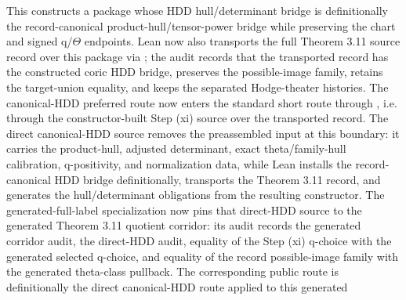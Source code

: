 \begin{proposition}
  This constructs a package whose HDD hull/determinant bridge is definitionally
  the record-canonical product-hull/tensor-power bridge while preserving the
  chart and signed q/\(\Theta\) endpoints.  Lean now also transports the full
  Theorem 3.11 source record over this package via
  ;
  the audit
  records that the transported record has the constructed coric HDD bridge,
  preserves the possible-image family, retains the target-union equality, and
  keeps the separated Hodge-theater histories.  The canonical-HDD preferred
  route now enters the standard short route through
  ,
  i.e. through the constructor-built Step (xi) source over the transported
  record.  The direct canonical-HDD source
  removes the preassembled
   input at this boundary:
  it carries the product-hull, adjusted determinant, exact theta/family-hull
  calibration, q-positivity, and normalization data, while Lean installs the
  record-canonical HDD bridge definitionally, transports the Theorem 3.11 record,
  and generates the hull/determinant obligations from the resulting constructor.
  The generated-full-label specialization
  now pins that direct-HDD source to the generated Theorem 3.11 quotient
  corridor: its audit records the generated corridor audit, the direct-HDD audit,
  equality of the Step (xi) q-choice with the generated selected q-choice, and
  equality of the record possible-image family with the generated theta-class
  pullback.  The corresponding public route
  is definitionally the direct canonical-HDD route applied to this generated

\end{proposition}
